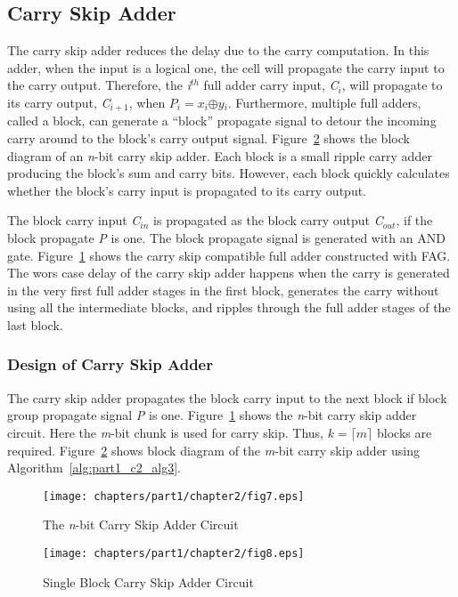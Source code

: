 \subsection{Carry Skip Adder}
The carry skip adder reduces the delay due to the carry computation. In this adder, when the input is a logical one, the cell will propagate the carry input to the carry output. Therefore, the {\it i${}^{th}$} full adder carry input, {\it C${}_{i}$}, will propagate to its carry output, {\it C${}_{i+1}$}, when {\it $P_i = x{}_{i}$$\oplus $$y{}_{i}$}. Furthermore, multiple full adders, called a block, can generate a ``block'' propagate signal to detour the incoming carry around to the block's carry output signal. Figure~\ref{fig:p1_c2_fig8} shows the block diagram of an {\it n}-bit carry skip adder. Each block is a small ripple carry adder producing the block's sum and carry bits. However, each block quickly calculates whether the block's carry input is propagated to its carry output.  

The block carry input {\it C${}_{in}$} is propagated as the block carry output {\it C${}_{out}$}, if the block propagate {\it P} is one. The block propagate signal is generated with an AND gate. Figure~\ref{fig:p1_c2_fig7} shows the carry skip compatible full adder constructed with FAG. The wors case delay of the carry skip adder happens when the carry is generated in the very first full adder stages in the first block, generates  the carry without using all the intermediate blocks, and ripples through the full adder stages of the last block.

\subsubsection{Design of Carry Skip Adder}
The carry skip adder propagates the block carry input to the next block if block group propagate signal {\it P} is one. Figure~\ref{fig:p1_c2_fig7} shows the {\it n}-bit carry skip adder circuit. Here the {\it m}-bit chunk is used for carry skip. Thus, $k=\lceil{m}\rceil$ blocks are required. Figure~\ref{fig:p1_c2_fig8} shows block diagram of the \textit{m}-bit carry skip adder using Algorithm~\ref{alg:part1_c2_alg3}.

\begin{figure}[!tbh]
	\centering
	\texttt{[image: chapters/part1/chapter2/fig7.eps]}
	\caption{The {\it n}-bit Carry Skip Adder Circuit}
	\label{fig:p1_c2_fig7}
\end{figure}


\begin{figure}[!tbh]
	\centering
	\texttt{[image: chapters/part1/chapter2/fig8.eps]}
	\caption{Single Block Carry Skip Adder Circuit}
	\label{fig:p1_c2_fig8}
\end{figure}

